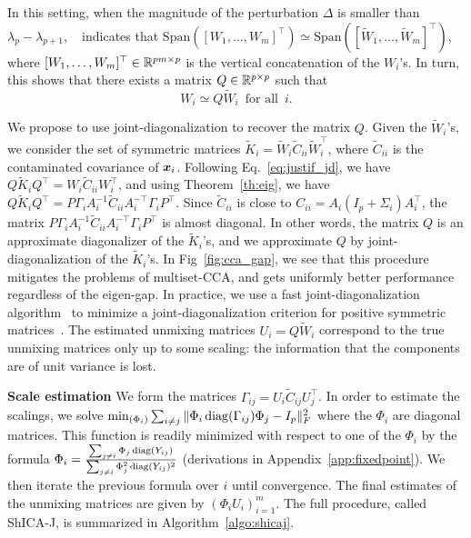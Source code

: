 In this setting, when the magnitude of the perturbation $\Delta$ is smaller than $\lambda_{p}-\lambda_{p+1}$, ~\cite{stewart1973error} indicates that $\mathrm{Span}([W_1, \dots, W_m]^{\top})\simeq \mathrm{Span}([\tilde{W}_1,\dots, \tilde{W}_m]^\top)$, where $[W_1, \dots, W_m]^{\top}\in\mathbb{R}^{pm\times p}$ is the vertical concatenation of the $W_i$'s.
In turn, this shows that there exists a matrix $Q\in\mathbb{R}^{p\times p}$ such that
%
%
\begin{equation}
    \label{eq:justif_jd}
    W_i \simeq Q\tilde{W}_i\enspace \text{for all} \enspace i.
\end{equation}

We propose to use joint-diagonalization to recover the matrix $Q$. Given the $\tilde{W}_i$'s, we consider the set of symmetric matrices $\tilde{K}_i = \tilde{W}_i\tilde{C}_{ii}\tilde{W}_i^{\top}$, where $\tilde{C}_{ii}$ is the contaminated covariance of $\boldsymbol{x}_i$. Following Eq.~\eqref{eq:justif_jd}, we have $Q\tilde{K}_iQ^{\top} = W_i \tilde{C}_{ii}W_i^{\top}$, and using Theorem~\ref{th:eig}, we have $Q\tilde{K}_iQ^{\top} = P\Gamma_i A_i^{-1}\tilde{C}_{ii}A_i^{-\top}\Gamma_iP^{\top}$. Since $\tilde{C}_{ii}$ is close to $C_{ii} = A_i (I_p + \Sigma_i)A_i^\top$, the matrix $P\Gamma_i A_i^{-1}\tilde{C}_{ii}A_i^{-\top}\Gamma_iP^{\top}$ is almost diagonal.
%
In other words, the matrix $Q$ is an approximate diagonalizer of the $\tilde{K}_i$'s, and we approximate $Q$ by joint-diagonalization of the $\tilde{K}_i$'s. In Fig~\ref{fig:cca_gap}, we see that this procedure mitigates the problems of multiset-CCA, and gets uniformly better performance regardless of the eigen-gap.
%
In practice, we use a fast joint-diagonalization algorithm~\cite{ablin2018beyond} to minimize a joint-diagonalization criterion for positive symmetric matrices~\cite{pham2001joint}. The estimated unmixing matrices $U_i = Q\tilde{W}_i$ correspond to the true unmixing matrices only up to some scaling: the information that the components are of unit variance is lost.

\textbf{Scale estimation}
We form the matrices $\Gamma_{ij} = U_i\tilde{C}_{ij}U_j^\top$. In order to estimate the scalings, we solve $
\min_{(\Phi_i)} \sum_{i\neq j} \| \Phi_i \operatorname*{diag}(\Gamma_{ij}) \Phi_j - I_p \|_F^2$
where the $\Phi_i$ are diagonal matrices.
This function is readily minimized with respect to one of the $\Phi_i$ by the formula
$\Phi_i = \frac{\sum_{j \neq i} \Phi_j \operatorname*{diag}(Y_{ij})}{\sum_{j \neq i} \Phi_j^2 \operatorname*{diag}(Y_{ij})^2}$ (derivations in Appendix~\ref{app:fixedpoint}). We then iterate the previous formula over $i$ until convergence.
The final estimates of the unmixing matrices are given by
$(\Phi_i U_i)_{i=1}^m$. The full procedure, called ShICA-J, is summarized in Algorithm~\ref{algo:shicaj}.

